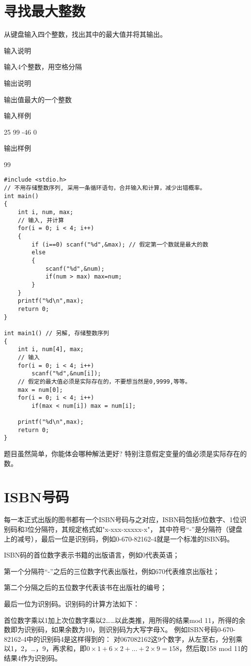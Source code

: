 \section{寻找最大整数}
从键盘输入四个整数，找出其中的最大值并将其输出。

输入说明
	
输入4个整数，用空格分隔

输出说明
	
输出值最大的一个整数

输入样例
	
25 99 -46 0

输出样例
	
99

\begin{lstlisting}
#include <stdio.h>
// 不用存储整数序列, 采用一条循环语句，合并输入和计算，减少出错概率。 
int main() 
{
	int i, num, max;
	// 输入, 并计算 
	for(i = 0; i < 4; i++) 
	{ 
		if (i==0) scanf("%d",&max); // 假定第一个数就是最大的数 
		else
		{
			scanf("%d",&num);
			if(num > max) max=num; 
		} 
	} 
	printf("%d\n",max);
	return 0;
} 

int main1() // 另解, 存储整数序列
{
	int i, num[4], max;
	// 输入 
	for(i = 0; i < 4; i++) 
		scanf("%d",&num[i]);
	// 假定的最大值必须是实际存在的，不要想当然是0,9999,等等。
	max = num[0]; 
	for(i = 0; i < 4; i++)  
		if(max < num[i]) max = num[i];
	
	printf("%d\n",max);
	return 0;
} 
\end{lstlisting}

\begin{note}[要点]
	题目虽然简单，你能体会哪种解法更好? 特别注意假定变量的值必须是实际存在的数。
\end{note}

\section{ISBN号码}
每一本正式出版的图书都有一个ISBN号码与之对应，ISBN码包括9位数字、1位识别码和3位分隔符，其规定格式如"x-xxx-xxxxx-x"，
其中符号“-”是分隔符（键盘上的减号），最后一位是识别码，例如0-670-82162-4就是一个标准的ISBN码。

ISBN码的首位数字表示书籍的出版语言，例如0代表英语；

第一个分隔符“-”之后的三位数字代表出版社，例如670代表维京出版社；

第二个分隔之后的五位数字代表该书在出版社的编号；

最后一位为识别码。识别码的计算方法如下：

首位数字乘以1加上次位数字乘以2……以此类推，用所得的结果mod 11，所得的余数即为识别码，如果余数为10，则识别码为大写字母X。
例如ISBN号码0-670-82162-4中的识别码4是这样得到的：
对067082162这9个数字，从左至右，分别乘以1，2，\dots，9，再求和，即$0\times 1+6\times 2+\dots +2\times 9=158$，然后取158 mod 11的结果4作为识别码。

